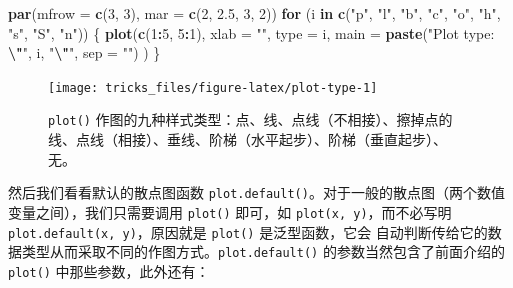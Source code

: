 \documentclass[
  b5paper,
  UTF8,twoside]{book}
\newenvironment{Shaded}{\begin{snugshade}}{\end{snugshade}}
\newcommand{\AttributeTok}[1]{\textcolor[rgb]{0.13,0.29,0.53}{#1}}
\newcommand{\ControlFlowTok}[1]{\textcolor[rgb]{0.13,0.29,0.53}{\textbf{#1}}}
\newcommand{\DecValTok}[1]{\textcolor[rgb]{0.00,0.00,0.81}{#1}}
\newcommand{\FloatTok}[1]{\textcolor[rgb]{0.00,0.00,0.81}{#1}}
\newcommand{\FunctionTok}[1]{\textcolor[rgb]{0.13,0.29,0.53}{\textbf{#1}}}
\newcommand{\NormalTok}[1]{#1}
\newcommand{\SpecialCharTok}[1]{\textcolor[rgb]{0.81,0.36,0.00}{\textbf{#1}}}
\newcommand{\StringTok}[1]{\textcolor[rgb]{0.31,0.60,0.02}{#1}}
\begin{document}
\begin{Shaded}
\begin{Highlighting}[]
\FunctionTok{par}\NormalTok{(}\AttributeTok{mfrow =} \FunctionTok{c}\NormalTok{(}\DecValTok{3}\NormalTok{, }\DecValTok{3}\NormalTok{), }\AttributeTok{mar =} \FunctionTok{c}\NormalTok{(}\DecValTok{2}\NormalTok{, }\FloatTok{2.5}\NormalTok{, }\DecValTok{3}\NormalTok{, }\DecValTok{2}\NormalTok{))}
\ControlFlowTok{for}\NormalTok{ (i }\ControlFlowTok{in} \FunctionTok{c}\NormalTok{(}\StringTok{"p"}\NormalTok{, }\StringTok{"l"}\NormalTok{, }\StringTok{"b"}\NormalTok{, }\StringTok{"c"}\NormalTok{, }\StringTok{"o"}\NormalTok{, }\StringTok{"h"}\NormalTok{, }\StringTok{"s"}\NormalTok{, }\StringTok{"S"}\NormalTok{, }\StringTok{"n"}\NormalTok{)) \{}
  \FunctionTok{plot}\NormalTok{(}\FunctionTok{c}\NormalTok{(}\DecValTok{1}\SpecialCharTok{:}\DecValTok{5}\NormalTok{, }\DecValTok{5}\SpecialCharTok{:}\DecValTok{1}\NormalTok{), }\AttributeTok{xlab =} \StringTok{""}\NormalTok{, }\AttributeTok{type =}\NormalTok{ i,}
    \AttributeTok{main =} \FunctionTok{paste}\NormalTok{(}\StringTok{"Plot type: }\SpecialCharTok{\textbackslash{}"}\StringTok{"}\NormalTok{, i, }\StringTok{"}\SpecialCharTok{\textbackslash{}"}\StringTok{"}\NormalTok{, }\AttributeTok{sep =} \StringTok{""}\NormalTok{)}
\NormalTok{  )}
\NormalTok{\}}
\end{Highlighting}
\end{Shaded}

\begin{figure}

{\centering \texttt{[image: tricks\_files/figure-latex/plot-type-1]} 

}

\caption[\texttt{plot()} 作图的九种样式]{\texttt{plot()} 作图的九种样式类型：点、线、点线（不相接）、擦掉点的线、点线（相接）、垂线、阶梯（水平起步）、阶梯（垂直起步）、无。}\label{fig:plot-type}
\end{figure}





然后我们看看默认的散点图函数 \texttt{plot.default()}。对于一般的散点图（两个数值变量之间），我们只需要调用 \texttt{plot()} 即可，如 \texttt{plot(x,\ y)}，而不必写明 \texttt{plot.default(x,\ y)}，原因就是 \texttt{plot()} 是泛型函数，它会 自动判断传给它的数据类型从而采取不同的作图方式。\texttt{plot.default()} 的参数当然包含了前面介绍的 \texttt{plot()} 中那些参数，此外还有：
\end{document}
